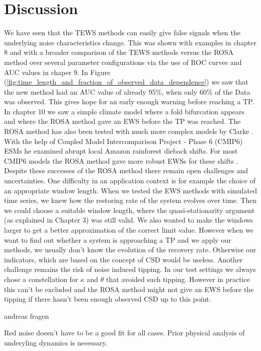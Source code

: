 \documentclass[%
thesis=student,%
coverpage=false,%
titlepage=false,%
headmarks=true, %
english,%
font=libertine, %
math=newpxtx, %
BCOR=5mm,%
coverBCOR=11mm%
]{tumbook}
\begin{document}
\chapter{Discussion}

We have seen that the TEWS methods can easily give false signals when the underlying noise characteristics change. This was shown with examples in chapter 8 and with a broader comparison of the TEWS methods versus the ROSA method over several parameter configurations via the use of ROC curves and AUC values in chaper 9. In Figure (\ref{fig:time_length_and_fraction_of_observed_data_dependence}) we saw that the new method had an AUC value of already 95\%, when only 60\% of the Data was observed. This gives hope for an early enough warning before reaching a TP. 
In chapter 10 we saw a simple climate model where a fold bifurcation appears and where the ROSA method gave an EWS before the TP was reached. The ROSA method has also been tested with much more complex models by Clarke \cite{Clarke:2023}. With the help of Coupled Model Intercomparison Project - Phase 6 (CMIP6) ESMs he examined abrupt local Amazon rainforest dieback shifts. For most CMIP6 models the ROSA method gave more robust EWSs for these shifts \cite{Clarke:2023}.
Despite these successes of the ROSA method there remain open challenges and uncertainties. One difficulty in an application context is for example the choice of an appropriate window length. When we tested the EWS methods with simulated time series, we knew how the restoring rate of the system evolves over time. Then we could choose a suitable window length, where the quasi-stationarity argument (as explained in Chapter 3) was still valid. We also wanted to make the windows larger to get a better approximation of the correct limit value. However when we want to find out whether a system is approaching a TP and we apply our methods, we usually don't know the evolution of the recovery rate. Otherwise our indicators, which are based on the concept of CSD would be useless. 
Another challenge remains the risk of noise induced tipping. In our test settings we always chose a constellation for $\kappa$ and $\theta$ that avoided such tipping. However in practice this can't be excluded and the ROSA method might not give an EWS before the tipping if there hasn't been enough observed CSD up to this point. 

andreas fragen

Red noise doesn't have to be a good fit for all cases. Prior physical analysis of underyling dynamics is necessary. 
\end{document}
